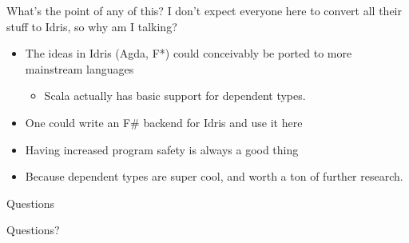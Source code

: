 \documentclass{beamer}
\begin{document}
\begin{frame}{What's the point of any of this? }
 	\transdissolve[duration=0.3]
	I don't expect everyone here to convert all their stuff to Idris, so why am I talking? 
	\begin{itemize}
		\pause
		\item The ideas in Idris (Agda, F*) could conceivably be ported to more mainstream languages \begin{itemize} 
				\pause
				\item Scala actually has basic support for dependent types.
			\end{itemize}	
		\pause
		\item One could write an F\# backend for Idris and use it here
		\item Having increased program safety is always a good thing
		\pause
		\item Because dependent types are super cool, and worth a ton of further research. 
	\end{itemize}
\end{frame}
\begin{frame}{Questions }
	\transdissolve[duration=0.3]
	\begin{center}
		Questions? 
	\end{center}
\end{frame}
\end{document}
